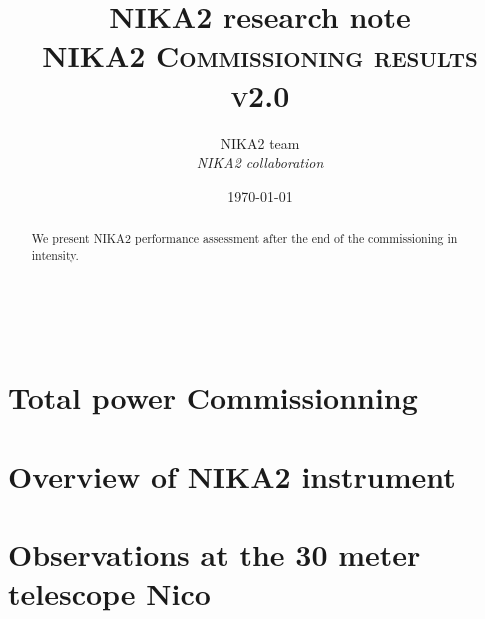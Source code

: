 \documentclass[a4paper, 11pt]{article} %
\title{\textbf{NIKA2 research note}\\   
\textsc{NIKA2 Commissioning results v2.0}} %
\author{NIKA2 team %
\\{\textit{NIKA2 collaboration}}} %
\date{\today} %
\makeatletter
\renewcommand{\maketitle}{ %
\begin{flushleft} %
{\LARGE\@title} %

\vspace{50pt} %

{\large\@author} %
\\\@date %

\vspace{40pt} %
\end{flushleft}
}
\makeatother
\begin{document}
\maketitle %
%
%
%
\tableofcontents

\newpage
\begin{abstract}
We present NIKA2 performance assessment after the end of the commissioning in intensity.
\end{abstract}



\newpage
%
%



\section{Total power Commissionning}
\label{se:intro}



\clearpage
\section{Overview of NIKA2 instrument}
\label{se:bandpasses}


\clearpage
\section{Observations at the 30 meter telescope {\color{blue} Nico}}
\label{se:observation}

\end{document}
